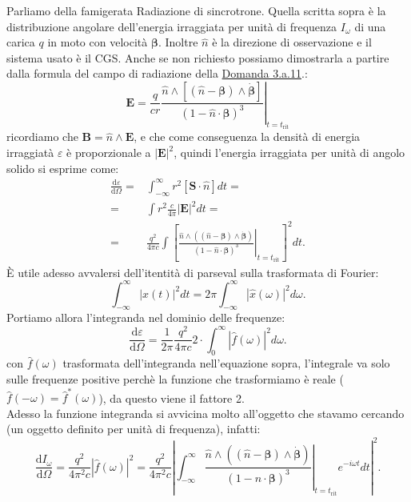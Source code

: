 \label{sec:3.a.14}
Parliamo della famigerata Radiazione di sincrotrone.
Quella scritta sopra è la distribuzione angolare dell'energia irraggiata per unità di frequenza $I_{\omega}$ di una carica $q$ in moto con velocità  $\boldsymbol{\beta}$. Inoltre $\hat{n}$ è la direzione di osservazione e il sistema usato è il CGS. 
Anche se non richiesto possiamo dimostrarla a partire dalla formula del campo di radiazione della \hyperref[sec:3.a.11]{Domanda 3.a.11}.:
\[
	\boldsymbol{E}= \left. \frac{q}{cr}
	\frac{\hat{n}\wedge\left[\left(\hat{n}-\boldsymbol{\beta}\right)\wedge\dot{\boldsymbol{\beta}}\right]}
	{\left(1-\hat{n}\cdot \boldsymbol{\beta}\right)^3} \right|_{t=t_{\text{rit}}}
\]
ricordiamo che $\boldsymbol{B}=\hat{n}\wedge \boldsymbol{E}$, e che come conseguenza la densità di energia irraggiatà $\varepsilon$ è proporzionale a $\left| \boldsymbol{E} \right| ^2$, quindi l'energia irraggiata per unità di angolo solido si esprime come:
\begin{align*}
	\frac{\mbox{d} \varepsilon}{\mbox{d} \Omega} =& \int_{-\infty}^{\infty}r^2 \left[ \boldsymbol{S}\cdot\hat{n}\right] dt =\\
	=& \int r^2 \frac{c}{4\pi}\left| \boldsymbol{E} \right|^2 dt = \\
	=& \frac{q^2}{4\pi c} \int \left[ \left. \frac{ \hat{n} \wedge \left( \left( \hat{n}-\boldsymbol{\beta} \right)\wedge\dot{\boldsymbol{\beta}}\right)}
		{\left( 1- \hat{n}\cdot \boldsymbol{\beta} \right)^3 } \right|_{t = t_{\text{rit}}} \right]^2 dt
.\end{align*}
È utile adesso avvalersi dell'itentità di parseval sulla trasformata di Fourier:
\[
	\int_{-\infty}^{\infty} \left| x\left( t \right)  \right|^2 dt = 2\pi \int_{-\infty}^{\infty} \left| \hat{x}\left( \omega \right)\right|^2d\omega 
.\] 
Portiamo allora l'integranda nel dominio delle frequenze:
\[
	\frac{\mbox{d} \varepsilon}{\mbox{d} \Omega} = \frac{1}{2\pi}  \frac{q^2}{4\pi c} 2 \cdot\int_0^{\infty} \left| \hat{f}\left( \omega \right) \right|^2 d \omega 
.\] 
con $\hat{f}\left( \omega \right) $ trasformata dell'integranda nell'equazione sopra, l'integrale va solo sulle frequenze positive perchè la funzione che trasformiamo è reale ($\hat{f}\left( -\omega \right) = \hat{f}^*\left( \omega \right) $), da questo viene il fattore 2.\\
Adesso la funzione integranda si avvicina molto all'oggetto che stavamo cercando (un oggetto definito per unità di frequenza), infatti:
\[
	\frac{\mbox{d} I_{\omega}}{\mbox{d} \Omega} = \frac{q^2}{4\pi^2 c} \left| \hat{f}\left( \omega \right)  \right|^2 =  \frac{q^2}{4\pi^2 c} 
	\left| \int_{-\infty}^{\infty} \left. \frac{ \hat{n} \wedge \left( \left( \hat{n}-\boldsymbol{\beta} \right)\wedge\dot{\boldsymbol{\beta}}\right)}
		{\left( 1- \hat{n}\cdot \boldsymbol{\beta} \right)^3 } \right|_{t = t_{\text{rit}}} e^{-i\omega t} dt \right|^2 
.\]
